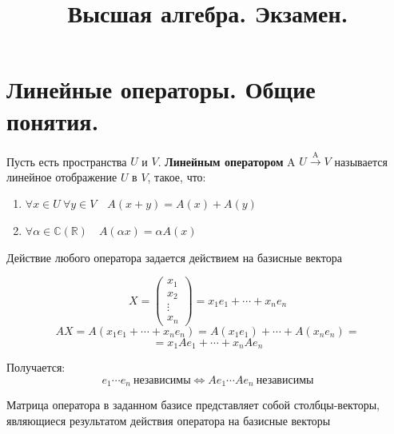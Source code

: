 \documentclass[14pt]{extreport}
\begin{document}
\thispagestyle{empty}
	\title{Высшая алгебра. Экзамен.}
	\maketitle

	\newpage
	\tableofcontents

    \newpage
    \chapter{Линейные операторы. Общие понятия.}

    \begin{defbox}
        Пусть есть пространства $U$ и $V$. \textbf{Линейным оператором }A $U \stackrel{\text{A}}{\rightarrow} V$ называется линейное отображение $U$ в $V$, такое, что:
        \begin{enumerate}
            \item $\forall x \in U \: \forall y \in V \quad A(x+y)=A(x)+A(y)$
            \item $\forall \alpha \in \mathbb{C}(\mathbb{R}) \quad A(\alpha x)=\alpha A(x)$
        \end{enumerate}
    \end{defbox}
    \begin{thbox}
        Действие любого оператора задается действием на базисные вектора
    \end{thbox}
    \begin{prbox}
        $$
        X = \begin{pmatrix}
            x_1\\
            x_2\\
            \vdots\\
            x_n
        \end{pmatrix} = x_1e_1 + \cdots + x_ne_n
        $$
        $$
        AX = A(x_1e_1 + \cdots + x_ne_n) = A(x_1e_1) + \cdots + A(x_ne_n) = 
        $$
        $$
        =x_1Ae_1 + \cdots + x_nAe_n
        $$

        Получается: 
        $$
        e_1 \cdots e_n \:\text{независимы} \Leftrightarrow Ae_1\cdots Ae_n \: \text{независимы}
        $$

        
    \end{prbox}
    \begin{impbox}
        Матрица оператора в заданном базисе представляет собой столбцы-векторы, являющиеся результатом действия оператора на базисные векторы
    \end{impbox}
\end{document}
